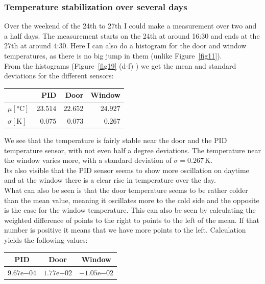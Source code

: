 \documentclass[12pt]{scrartcl}
\begin{document}
      \subsubsection{Temperature stabilization over several days}
      Over the weekend of the 24th to 27th I could make a measurement over two
      and a half days. The measurement starts on the 24th at around 16:30 and
      ends at the 27th at around 4:30. Here I can also do a histogram for the
      door and window temperatures, as there is no big jump in them (unlike
      Figure~\ref{fig11}).\\
      From the histograms (Figure~\ref{fig19} (d-f) ) we get the mean and
      standard deviations for the different sensors:
      \\
      \begin{table}[H]
        \begin{tabular}{l | r | r | r}
          & PID & Door & Window \\
          \hline
          $\mu[\text{°C}]$ & $23.514$ & $22.652$ & $24.927$ \\
          $\sigma[\text{K}]$ & $0.075$ & $0.073$ & $0.267$
        \end{tabular}
      \end{table}
      We see that the temperature is fairly stable near the door and the PID
      temperature sensor, with
      not even half a degree deviations. The temperature near the window varies
      more, with a standard deviation of $\sigma = 0.267\,\text{K}$.\\
      Its also visible that the PID sensor seems to show more oscillation on
      daytime and at the window there is a clear rise in temperature over the day.
      \\What can also be seen is that the door temperature seems to be rather
      colder than the mean value, meaning it oscillates more to the cold side
      and the opposite is the case for the window temperature. This can also be
      seen by calculating the weighted difference of points to the right to
      points to the left of the mean. If that number is positive it means that
      we have more points to the left.
      Calculation yields the following values: \vspace{-5pt}
      \begin{table}[H]
        \begin{tabular}{c | c | c}
          PID & Door & Window \\
          \hline
          $9.67\mathrm{e}{-04}$ & $1.77\mathrm{e}{-02}$ & $-1.05\mathrm{e}{-02}$
        \end{tabular}
      \end{table}
\end{document}
